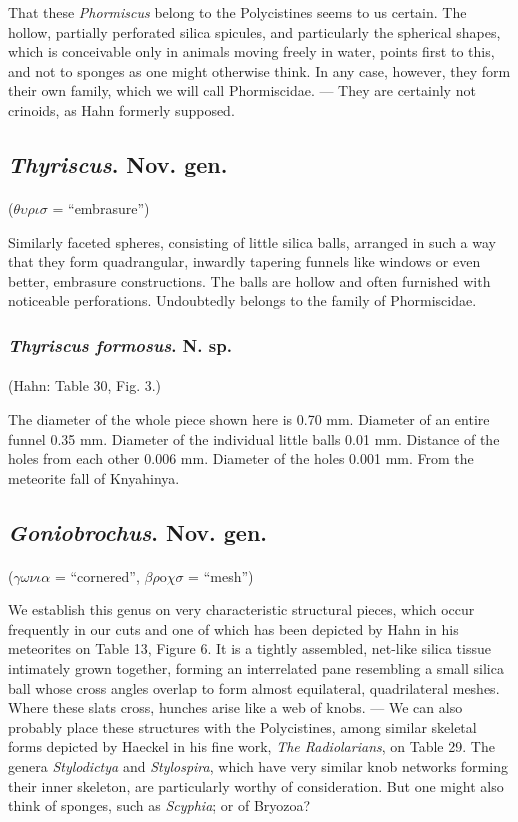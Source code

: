 \documentclass[a4paper, 12pt, oneside]{article}
\begin{document}
That these \emph{Phormiscus} belong to the Polycistines seems to us certain. The hollow, partially perforated silica spicules, and particularly the spherical shapes, which is conceivable only in animals moving freely in water, points first to this, and not to sponges as one might otherwise think. In any case, however, they form their own family, which we will call Phormiscidae. --- They are certainly not crinoids, as Hahn formerly supposed.
\subsection{\emph{Thyriscus}. Nov. gen.}
\paragraph{}
($\theta\upsilon\rho\iota\sigma$ = ``embrasure'')%

Similarly faceted spheres, consisting of little silica balls, arranged in such a way that they form quadrangular, inwardly tapering funnels like windows or even better, embrasure constructions. The balls are hollow and often furnished with noticeable perforations. Undoubtedly belongs to the family of Phormiscidae.
\subsubsection{\emph{Thyriscus formosus}. N. sp.}
\paragraph{}
(Hahn: Table 30, Fig. 3.)

The diameter of the whole piece shown here is 0.70 mm. Diameter of an entire funnel 0.35 mm. Diameter of the individual little balls 0.01 mm. Distance of the holes from each other 0.006 mm. Diameter of the holes 0.001 mm. From the meteorite fall of Knyahinya.
\subsection{\emph{Goniobrochus}. Nov. gen.}
\paragraph{}
($\gamma\omega\nu\iota\alpha$ = ``cornered'', $\beta\rho$o$\chi\sigma$ = ``mesh'')%

We establish this genus on very characteristic structural pieces, which occur frequently in our cuts and one of which has been depicted by Hahn in his meteorites on Table 13, Figure 6. It is a tightly assembled, net-like silica tissue intimately grown together, forming an interrelated pane resembling a small silica ball whose cross angles overlap to form almost equilateral, quadrilateral meshes. Where these slats cross, hunches arise like a web of knobs. --- We can also probably place these structures with the Polycistines, among similar skeletal forms depicted by Haeckel in his fine work, \emph{The Radiolarians}, on Table 29. The genera \emph{Stylodictya} and \emph{Stylospira}, which have very similar knob networks forming their inner skeleton, are particularly worthy of consideration. But one might also think of sponges, such as \emph{Scyphia}; or of Bryozoa?
\end{document}
